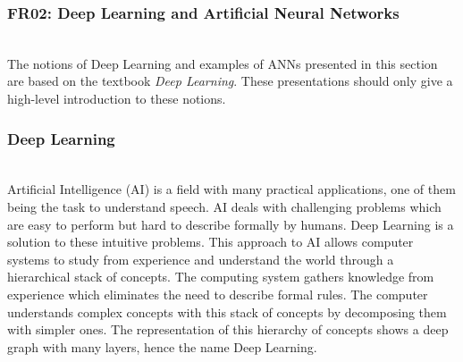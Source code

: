 
\subsubsection{FR02: Deep Learning and Artificial Neural Networks}\label{ann}~\\

The notions of Deep Learning and examples of ANNs presented in this section are
based on the textbook \textit{Deep Learning}\cite{Goodfellow-et-al-2016}. These
presentations should only give a high-level introduction to these notions.

\subsubsection{Deep Learning}~\\


Artificial Intelligence (AI) is a field with many practical applications, one of
them being the task to understand speech. AI deals with challenging problems
which are easy to perform but hard to describe formally by humans. Deep Learning
is a solution to these intuitive problems. This approach to AI allows computer
systems to study from experience and understand the world through a hierarchical
stack of concepts. The computing system gathers knowledge from experience which
eliminates the need to describe formal rules. The computer understands complex
concepts with this stack of concepts by decomposing them with simpler ones. The
representation of this hierarchy of concepts shows a deep graph with many
layers, hence the name Deep Learning.~\cite{Goodfellow-et-al-2016}
